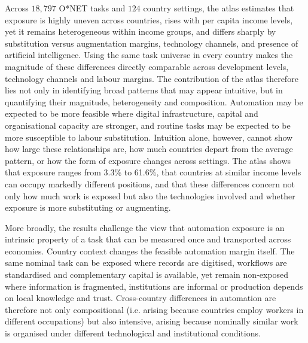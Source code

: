 \documentclass[11pt]{article}
\begin{document}
Across $18{,}797$ O*NET tasks and $124$ country settings, the atlas estimates that exposure is highly uneven across countries, rises with per capita income levels, yet it remains heterogeneous within income groups, and differs sharply by substitution versus augmentation margins, technology channels, and presence of artificial intelligence. Using the same task universe in every country makes the magnitude of these differences directly comparable across development levels, technology channels and labour margins. The contribution of the atlas therefore lies not only in identifying broad patterns that may appear intuitive, but in quantifying their magnitude, heterogeneity and composition. Automation may be expected to be more feasible where digital infrastructure, capital and organisational capacity are stronger, and routine tasks may be expected to be more susceptible to labour substitution. Intuition alone, however, cannot show how large these relationships are, how much countries depart from the average pattern, or how the form of exposure changes across settings. The atlas shows that exposure ranges from 3.3\% to 61.6\%, that countries at similar income levels can occupy markedly different positions, and that these differences concern not only how much work is exposed but also the technologies involved and whether exposure is more substituting or augmenting.

More broadly, the results challenge the view that automation exposure is an intrinsic property of a task that can be measured once and transported across economies. Country context changes the feasible automation margin itself. The same nominal task can be exposed where records are digitised, workflows are standardised and complementary capital is available, yet remain non-exposed where information is fragmented, institutions are informal or production depends on local knowledge and trust. Cross-country differences in automation are therefore not only compositional (i.e. arising because countries employ workers in different occupations) but also intensive, arising because nominally similar work is organised under different technological and institutional conditions.
\end{document}
